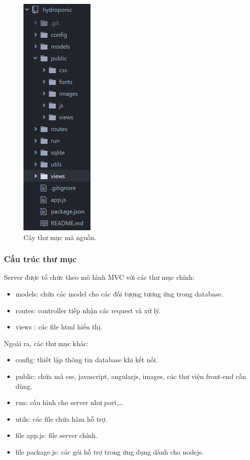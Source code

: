 \documentclass[a4paper,12pt,oneside]{article}
\begin{document}
\begin{center}
\begin{figure}[H]
\begin{center}
\includegraphics[scale=1.]{hinh/folder.png}
\end{center}
\caption{Cây thư mục mã nguồn.}
\end{figure}
\end{center}
\subsubsection{Cấu trúc thư mục}

Server được tổ chức theo mô hình MVC với các thư mục chính:
\begin{itemize}
\item models: chứa các model cho các đối tượng tương ứng trong database.
\item routes: controller tiếp nhận các request và xử lý.
\item views : các file html hiển thị.
\end{itemize}

Ngoài ra, các thư mục khác:
\begin{itemize}
\item config: thiết lập thông tin database khi kết nối.
\item public: chứa mã css, javascript, angularjs, images, các thư viện front-end cần dùng.
\item run: cấu hình cho server như port,…
\item utils: các file chứa hàm hỗ trợ.
\item file app.js: file server chính.
\item file package.js: các gói hỗ trợ trong ứng dụng dành cho nodejs.
\end{itemize}
\end{document}
